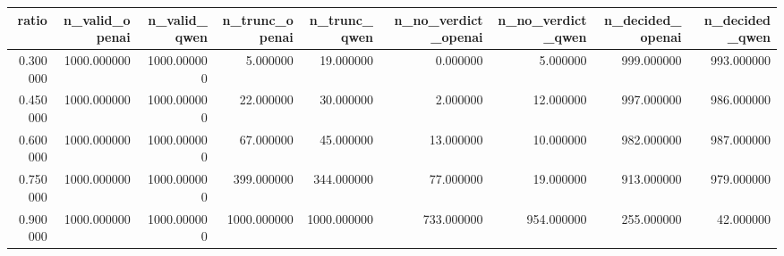 \begin{tabular}{rrrrrrrrr}
\toprule
ratio & n_valid_openai & n_valid_qwen & n_trunc_openai & n_trunc_qwen & n_no_verdict_openai & n_no_verdict_qwen & n_decided_openai & n_decided_qwen \\
\midrule
0.300000 & 1000.000000 & 1000.000000 & 5.000000 & 19.000000 & 0.000000 & 5.000000 & 999.000000 & 993.000000 \\
0.450000 & 1000.000000 & 1000.000000 & 22.000000 & 30.000000 & 2.000000 & 12.000000 & 997.000000 & 986.000000 \\
0.600000 & 1000.000000 & 1000.000000 & 67.000000 & 45.000000 & 13.000000 & 10.000000 & 982.000000 & 987.000000 \\
0.750000 & 1000.000000 & 1000.000000 & 399.000000 & 344.000000 & 77.000000 & 19.000000 & 913.000000 & 979.000000 \\
0.900000 & 1000.000000 & 1000.000000 & 1000.000000 & 1000.000000 & 733.000000 & 954.000000 & 255.000000 & 42.000000 \\
\bottomrule
\end{tabular}

